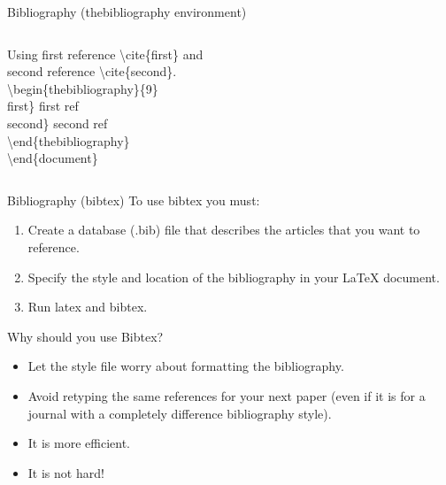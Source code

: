 \documentclass[10pt,xcolor={dvipsnames}]{beamer}
\begin{document}
\begin{frame}{Bibliography (thebibliography environment)}
\begin{columns}[T]
\begin{column}{.5 \textwidth}
\begin{example}
							\quad Using first reference {\color{orange}\textbackslash cite\{}first{\color{orange}\}} and \\
							\quad second reference {\color{orange}\textbackslash cite\{}second{\color{orange}\}}.\\
							\quad\textbackslash begin\{{\color{orange}thebibliography}\}{\color{orange}\{9\}}\\
								first{\color{orange}\}} first ref\\
								second{\color{orange}\}} second ref\\
							\quad\textbackslash end\{{\color{orange}thebibliography}\}\\
						
						\textbackslash end\{{\color{blue}document}\}\\
					\end{example}
					
				\end{column}
			\end{columns}
		
		\end{frame}
	
		\begin{frame}{Bibliography (bibtex)}
			\onslide<2->
			To use bibtex you must:
			\begin{enumerate}
				\item<3-> Create a database (.bib) file that describes the articles that you want to reference.
				\item<4-> Specify the style and location of the bibliography in your LaTeX document.
				\item<5-> Run latex and bibtex.
			\end{enumerate}
			
			\vspace{1cm}
			Why should you use Bibtex?
			\begin{itemize}
				\item<7-> Let the style file worry about formatting the bibliography.
				\item<8-> Avoid retyping the same references for your next paper (even if it is for a journal with a completely difference bibliography style).
				\item<9-> It is more efficient.
				\item<10-> It is not hard!
			\end{itemize}

		\end{frame}
	
\end{document}
